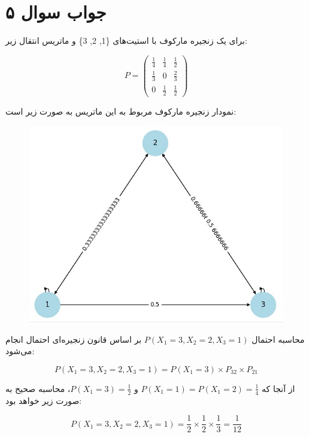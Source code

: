 \section*{جواب سوال ۵}

برای یک زنجیره مارکوف با استیت‌های \{1, 2, 3\} و ماتریس انتقال زیر:

\[
P = \begin{pmatrix}
	\frac{1}{4} & \frac{1}{4} & \frac{1}{2} \\
	\frac{1}{3} & 0 & \frac{2}{3} \\
	0 & \frac{1}{2} & \frac{1}{2}
\end{pmatrix}
\]

نمودار زنجیره مارکوف مربوط به این ماتریس به صورت زیر است:

\begin{figure}[H]
	\centering
	\includegraphics{pic1.jpg}
	\label{fig:label4}
\end{figure}

محاسبه احتمال \(P(X_1 = 3, X_2 = 2, X_3 = 1)\) بر اساس قانون زنجیره‌ای احتمال انجام می‌شود:

\[
P(X_1 = 3, X_2 = 2, X_3 = 1) = P(X_1 = 3) \times P_{32} \times P_{21}
\]

از آنجا که \(P(X_1 = 1) = P(X_1 = 2) = \frac{1}{4}\) و \(P(X_1 = 3) = \frac{1}{2}\)، محاسبه صحیح به صورت زیر خواهد بود:

\[
P(X_1 = 3, X_2 = 2, X_3 = 1) = \frac{1}{2} \times \frac{1}{2} \times \frac{1}{3} = \frac{1}{12}
\]